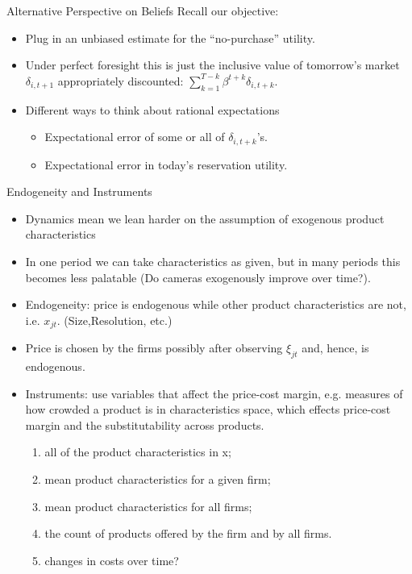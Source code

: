 \documentclass[xcolor=pdftex,dvipsnames,table,mathserif,aspectratio=169]{beamer}
\begin{document}
\begin{frame}{Alternative Perspective on Beliefs}
Recall our objective:
\begin{itemize}
\item Plug in an unbiased estimate for the ``no-purchase'' utility.
\item Under perfect foresight this is just the inclusive value of tomorrow's market $\delta_{i,t+1}$  appropriately discounted: $\sum_{k=1}^{T-k} \beta^{t+k} \delta_{i,t+k}$.
\item Different ways to think about \alert{rational expectations}
\begin{itemize}
\item Expectational error of some or all of $\delta_{i,t+k}$'s.
\item Expectational error in today's reservation utility.
\end{itemize}
\end{itemize}
\end{frame}


\begin{frame}{Endogeneity and Instruments}
\footnotesize
\begin{itemize}
\item Dynamics mean we  \alert{lean harder on the assumption of exogenous product characteristics} 
\item In one period we can take characteristics as given, but in many periods this becomes less palatable (Do cameras exogenously improve over time?).
\item Endogeneity: price is endogenous while other product characteristics are not, i.e. $x_{jt}$. (Size,Resolution, etc.)
\item Price is chosen by the firms possibly after observing $\xi_{jt}$ and, hence, is endogenous.
\item Instruments: use variables that affect the price-cost margin, e.g. measures of how crowded a product is in characteristics space, which effects price-cost margin and the substitutability across products.
\begin{enumerate}
\item  all of the product characteristics in x;
\item mean product characteristics for a given firm;
\item mean product characteristics for all firms;
\item the count of products offered by the firm and by all firms.
\item changes in costs over time?
\end{enumerate}
\end{itemize}
\end{frame}
\end{document}
